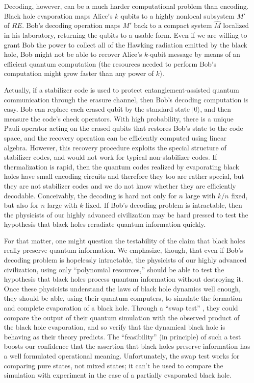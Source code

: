 \documentclass[12pt]{article}
\begin{document}
Decoding, however, can be a much harder computational problem than encoding. Black hole evaporation maps Alice's $k$ qubits to a highly nonlocal subsystem $M'$ of $RE$. Bob's decoding operation maps $M'$ back to a compact system $\hat M$ localized in his laboratory, returning the qubits to a usable form. Even if we are willing to grant Bob the power to collect all of the Hawking radiation emitted by the black hole, Bob might not be able to recover Alice's $k$-qubit message by means of an efficient quantum computation (the resources needed to perform Bob's computation might grow faster than any power of $k$). 

Actually, if a stabilizer code is used to protect entanglement-assisted quantum communication through the erasure channel, then Bob's decoding computation is easy. Bob can replace each erased qubit by the standard state $|0\rangle$, and then measure the code's check operators. With high probability, there is a unique Pauli operator acting on the erased qubits that restores Bob's state to the code space, and the recovery operation can be efficiently computed using linear algebra. However, this recovery procedure exploits the special structure of stabilizer codes, and would not work for typical non-stabilizer codes. If thermalization is rapid, then the quantum codes realized by evaporating black holes have small encoding circuits and therefore they too are rather special, but they are not stabilizer codes and we do not know whether they are efficiently decodable. Conceivably, the decoding is hard not only for $n$ large with $k/n$ fixed, but also for $n$ large with $k$ fixed. If Bob's decoding problem is intractable, then the physicists of our highly advanced civilization may be hard pressed to test the hypothesis that black holes reradiate quantum information quickly. 

For that matter, one might question the testability of the claim that black holes really preserve quantum information. We emphasize, though, that even if Bob's decoding problem is hopelessly intractable, the physicists of our highly advanced civilization, using only ``polynomial resources,'' should be able to test the hypothesis that black holes process quantum information without destroying it. Once these physicists understand the laws of black hole dynamics well enough, they should be able, using their quantum computers, to simulate the formation and complete evaporation of a black hole. Through a ``swap test'' \cite{swap}, they could compare the output of their quantum simulation with the observed product of the black hole evaporation, and so verify that the dynamical black hole is behaving as their theory predicts. The ``feasibility'' (in principle) of such a test boosts our confidence that the assertion that black holes preserve information has a well formulated operational meaning. Unfortunately, the swap test works for comparing pure states, not mixed states; it can't be used to compare the simulation with experiment in the case of a partially evaporated black hole. 
\end{document}

